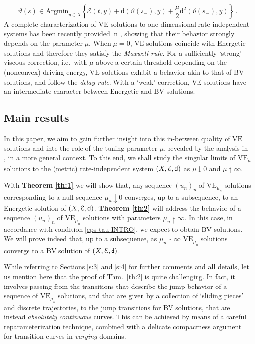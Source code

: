\documentclass[a4paper,10pt,reqno]{amsart} %
\numberwithin{equation}{section}
\newcommand{\down}{\downarrow}
\newcommand{\teta}{\vartheta}
\newcommand{\Xs}{X}
\newcommand{\BV}{\mathrm{BV}}
\newcommand{\mdn}{\mathsf{d}}
\newcommand{\md}[2]{\mathsf{d}(#1,#2)}
\newcommand{\ene}[2]{\mathcal{E}(#1,#2)}
\newcommand{\RIS}{(\Xs,\calE,\mdn)}
\newcommand{\VE}{\mathrm{VE}}
\newcommand{\VEa}[1]{\mathrm{VE}_{#1}}
\newcommand{\VEn}{\VEa{\mu_n}}
\begin{document}
\[
\teta(s) \in \mathrm{Argmin}_{y\in \Xs} \left\{ \ene ty + \md {\teta(s_-)}y+ \frac{\mu}2 \mdn^2(\teta(s_-),y)\right\}\,.
\]
A  complete characterization of $\VE$ solutions to one-dimensional rate-independent systems has been recently provided in 
\cite{Minotti16}, showing that their behavior strongly depends on the parameter $\mu$. When $\mu=0$, $\VE$ solutions coincide with Energetic solutions and therefore they satisfy the \emph{Maxwell rule}. For a sufficiently `strong' viscous correction, i.e.\ with $\mu$ above a certain threshold depending on the (nonconvex) driving energy, $\VE$ solutions exhibit a behavior akin to that of $\BV$ solutions, and follow the \emph{delay rule}. With a `weak' correction, $\VE$ solutions have an intermediate character between Energetic and $\BV$ solutions.
\subsection{Main results}
In this paper, we aim to
gain further insight into  this in-between quality of $\VE$ solutions and into the role of the 
tuning parameter $\mu$, revealed by the analysis in \cite{Minotti16}, in a more general context.  To this end, we shall study the singular limits
of  $\VEa{\mu}$  solutions to the (metric) rate-independent system $\RIS$
 as $\mu \down0$ and $\mu \uparrow \infty$. 
\par
With \textbf{Theorem \ref{th:1}} we will show that, any sequence $(u_n)_n$ of   $\VEn$ solutions corresponding to a null sequence $\mu_n \down 0$  
converges, up to a subsequence, to an Energetic solution of $\RIS$. 
\textbf{Theorem \ref{th:2}}  will address the behavior of a sequence $(u_n)_n$ of  $\VEn$  solutions with parameters $\mu_n \uparrow \infty$. In this case, in accordance with condition \eqref{eps-tau-INTRO}, we expect to obtain 
$\BV$ solutions. 
 We will prove indeed that, up to a subsequence, as $\mu_n\uparrow \infty$  $\VEn$ solutions converge  to a $\BV$ solution of $\RIS$.
\par
While referring to Sections \ref{s:3} and \ref{s:4} for further comments and all details, let us mention here that the proof of Thm.\ \ref{th:2} is quite challenging. In fact, it  involves passing 
from the  transitions that describe the jump behavior of a  sequence of  $\VEn$ solutions, and that are  given by a collection of `sliding
 pieces' and discrete trajectories, to the jump transitions for $\BV$ solutions, that  are instead \emph{absolutely continuous} curves. This can be achieved by  means of  a careful reparameterization technique, combined with a delicate compactness argument for transition curves in \emph{varying} domains.
\end{document}
